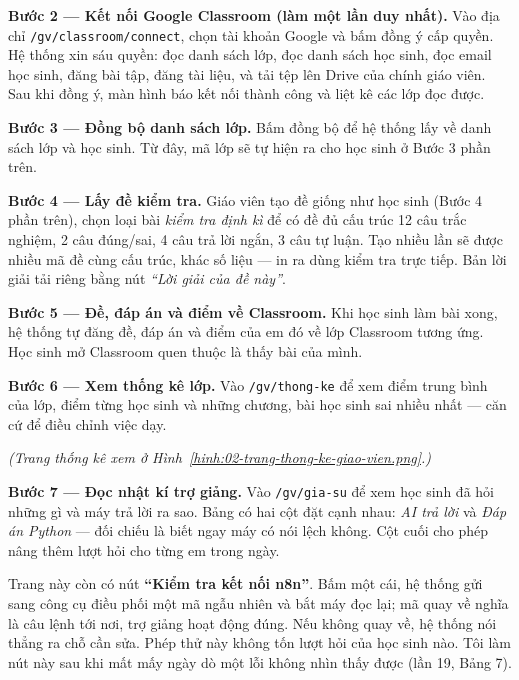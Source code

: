 \textbf{Bước 2 --- Kết nối Google Classroom (làm một lần duy nhất).} Vào địa
chỉ \texttt{/gv/classroom/connect}, chọn tài khoản Google và bấm đồng ý cấp
quyền. Hệ thống xin sáu quyền: đọc danh sách lớp, đọc danh sách học sinh, đọc
email học sinh, đăng bài tập, đăng tài liệu, và tải tệp lên Drive của chính
giáo viên. Sau khi đồng ý, màn hình báo kết nối thành công và liệt kê các lớp
đọc được.


\textbf{Bước 3 --- Đồng bộ danh sách lớp.} Bấm đồng bộ để hệ thống lấy về danh
sách lớp và học sinh. Từ đây, mã lớp sẽ tự hiện ra cho học sinh ở Bước 3 phần
trên.

\textbf{Bước 4 --- Lấy đề kiểm tra.} Giáo viên tạo đề giống như học sinh (Bước
4 phần trên), chọn loại bài \textit{kiểm tra định kì} để có đề đủ cấu trúc 12
câu trắc nghiệm, 2 câu đúng/sai, 4 câu trả lời ngắn, 3 câu tự luận. Tạo nhiều
lần sẽ được nhiều mã đề cùng cấu trúc, khác số liệu --- in ra dùng kiểm tra
trực tiếp. Bản lời giải tải riêng bằng nút \textit{``Lời giải của đề này''}.

\textbf{Bước 5 --- Đề, đáp án và điểm về Classroom.} Khi học sinh làm bài
xong, hệ thống tự đăng đề, đáp án và điểm của em đó về lớp Classroom tương
ứng. Học sinh mở Classroom quen thuộc là thấy bài của mình.


\textbf{Bước 6 --- Xem thống kê lớp.} Vào \texttt{/gv/thong-ke} để xem điểm
trung bình của lớp, điểm từng học sinh và những chương, bài học sinh sai nhiều
nhất --- căn cứ để điều chỉnh việc dạy.

\noindent\textit{(Trang thống kê xem ở Hình~\ref{hinh:02-trang-thong-ke-giao-vien.png}.)}

\textbf{Bước 7 --- Đọc nhật kí trợ giảng.} Vào \texttt{/gv/gia-su} để xem học
sinh đã hỏi những gì và máy trả lời ra sao. Bảng có hai cột đặt cạnh nhau:
\textit{AI trả lời} và \textit{Đáp án Python} --- đối chiếu là biết ngay máy có
nói lệch không. Cột cuối cho phép nâng thêm lượt hỏi cho từng em trong ngày.

Trang này còn có nút \textbf{``Kiểm tra kết nối n8n''}. Bấm một cái, hệ thống
gửi sang công cụ điều phối một mã ngẫu nhiên và bắt máy đọc lại; mã quay về
nghĩa là câu lệnh tới nơi, trợ giảng hoạt động đúng. Nếu không quay về, hệ
thống nói thẳng ra chỗ cần sửa. Phép thử này không tốn lượt hỏi của học sinh
nào. Tôi làm nút này sau khi mất mấy ngày dò một lỗi không nhìn thấy được
(lần 19, Bảng 7).

